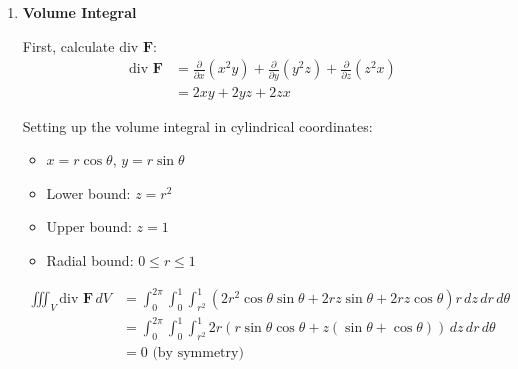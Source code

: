 \begin{example}
\begin{solution}
\begin{enumerate}
Converting both integrals to polar coordinates:
\begin{itemize}
    \item $x = r\cos\theta$, $y = r\sin\theta$
    \item For $S_1$: $z = r^2$
    \item For $S_2$: $z = 1$
    \item Bounds: $0 \leq r \leq 1$, $0 \leq \theta \leq 2\pi$
\end{itemize}

\begin{align*}
\iint_{S_1} \mathbf{F} \cdot \mathbf{n}_1\,dS &= \int_0^{2\pi}\int_0^1 (2r^4\cos^3\theta\sin\theta + 2r^5\sin^3\theta - r^5\cos\theta)r\,dr\,d\theta \\
&= 0 \text{ (odd functions over }[0,2\pi]\text{)}
\end{align*}

\begin{align*}
\iint_{S_2} \mathbf{F} \cdot \mathbf{n}_2\,dS &= \int_0^{2\pi}\int_0^1 r\cos\theta\,r\,dr\,d\theta = 0
\end{align*}

Therefore, the total surface integral is zero.

\item \textbf{Volume Integral}

First, calculate $\text{div }\mathbf{F}$:
\begin{align*}
\text{div }\mathbf{F} &= \frac{\partial}{\partial x}(x^2y) + \frac{\partial}{\partial y}(y^2z) + \frac{\partial}{\partial z}(z^2x) \\
&= 2xy + 2yz + 2zx
\end{align*}

Setting up the volume integral in cylindrical coordinates:
\begin{itemize}
    \item $x = r\cos\theta$, $y = r\sin\theta$
    \item Lower bound: $z = r^2$
    \item Upper bound: $z = 1$
    \item Radial bound: $0 \leq r \leq 1$
\end{itemize}

\begin{align*}
\iiint_V \text{div }\mathbf{F}\,dV &= \int_0^{2\pi}\int_0^1\int_{r^2}^1 (2r^2\cos\theta\sin\theta + 2rz\sin\theta + 2rz\cos\theta)r\,dz\,dr\,d\theta \\
&= \int_0^{2\pi}\int_0^1\int_{r^2}^1 2r(r\sin\theta\cos\theta + z(\sin\theta + \cos\theta))\,dz\,dr\,d\theta \\
&= 0 \text{ (by symmetry)}
\end{align*}
\end{enumerate}


\end{solution}
\end{example}
